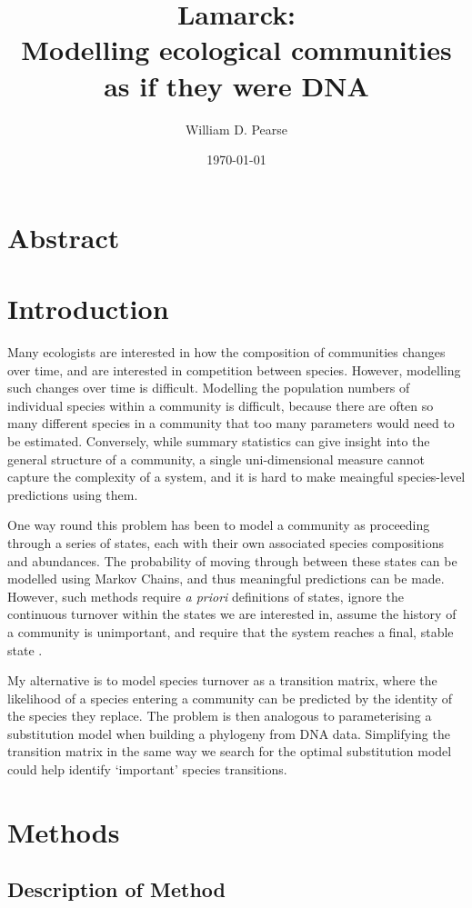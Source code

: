 \documentclass[11pt]{amsart}
\title[Lamarck]{Lamarck:\\Modelling ecological communities as if they were DNA}
\author{William D. Pearse}
\date{\today}                                           %
\begin{document}

\maketitle
\section{Abstract}
\clearpage
\section{Introduction}
Many ecologists are interested in how the composition of communities changes over time, and are interested in competition between species. However, modelling such changes over time is difficult. Modelling the population numbers of individual species within a community is difficult, because there are often so many different species in a community that too many parameters would need to be estimated. Conversely, while summary statistics can give insight into the general structure of a community, a single uni-dimensional measure cannot capture the complexity of a system, and it is hard to make meaingful species-level predictions using them.

One way round this problem has been to model a community as proceeding through a series of states, each with their own associated species compositions and abundances. The probability of moving through between these states can be modelled using Markov Chains, and thus meaningful predictions can be made. However, such methods require \emph{a priori} definitions of states, ignore the continuous turnover within the states we are interested in, assume the history of a community is unimportant, and require that the system reaches a final, stable state \cite{Logofet2000}.

My alternative is to model species turnover as a transition matrix, where the likelihood of a species entering a community can be predicted by the identity of the species they replace. The problem is then analogous to parameterising a substitution model when building a phylogeny from DNA data. Simplifying the transition matrix in the same way we search for the optimal substitution model could help identify `important' species transitions.
\clearpage
\section{Methods}
\subsection{Description of Method}
\end{document}
